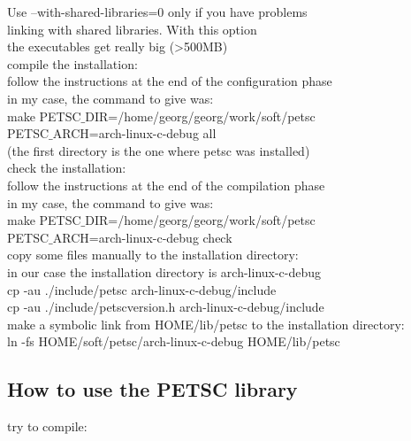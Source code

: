 	Use --with-shared-libraries=0 only if you have problems\\
		linking with shared libraries. With this option\\
		the executables get really big (>500MB)\\

compile the installation:\\

	follow the instructions at the end of the configuration phase\\

	in my case, the command to give was:\\
	make PETSC$\_$DIR=/home/georg/georg/work/soft/petsc \ \\
			PETSC$\_$ARCH=arch-linux-c-debug all\\
	(the first directory is the one where petsc was installed)\\

check the installation:\\

	follow the instructions at the end of the compilation phase\\

	in my case, the command to give was:\\
	make PETSC$\_$DIR=/home/georg/georg/work/soft/petsc \ \\
			PETSC$\_$ARCH=arch-linux-c-debug check\\

copy some files manually to the installation directory:\\

	in our case the installation directory is arch-linux-c-debug \\

	cp -au ./include/petsc arch-linux-c-debug/include \\
	cp -au ./include/petscversion.h arch-linux-c-debug/include \\

make a symbolic link from HOME/lib/petsc to the installation directory: \\

	ln -fs HOME/soft/petsc/arch-linux-c-debug HOME/lib/petsc \\

\subsection{How to use the PETSC library}


try to compile:\\

